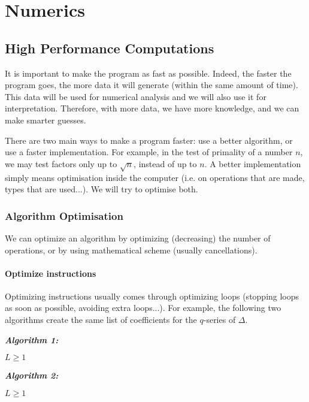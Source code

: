 \section{Numerics}
\subsection{High Performance Computations}
It is important to make the program as fast as possible.
Indeed, the faster the program goes, the more data it will generate (within the same amount of time).
This data will be used for numerical analysis and we will also use it for interpretation.
Therefore, with more data, we have more knowledge, and we can make smarter guesses.

There are two main ways to make a program faster:
use a better algorithm, or 
use a faster implementation.
For example, in the test of primality of a number $n$, we may test factors only up to $\sqrt{n}$, instead of up to $n$.
A better implementation simply means optimisation inside the computer (i.e. on operations that are made, types that are used...).
We will try to optimise both.


\subsubsection{Algorithm Optimisation}
\label{algorithmOptimisation}
We can optimize an algorithm by optimizing (decreasing) the number of operations, or by using mathematical scheme (usually cancellations).

\paragraph{Optimize instructions}
Optimizing instructions usually comes through optimizing loops (stopping loops as soon as possible, avoiding extra loops...).
For example, the following two algorithms create the same list of coefficients for the $q$-series of $\Delta$.

\textbf{\textit{Algorithm 1:}}
\begin{algorithmic}
	\color{CodeColor}
	\Require $L \geq 1$
		\EndIf
	\EndWhile
\end{algorithmic}

\textit{\textbf{Algorithm 2:}}
\begin{algorithmic}
	\color{CodeColor}
	\Require $L \geq 1$
	\EndWhile
\end{algorithmic}

